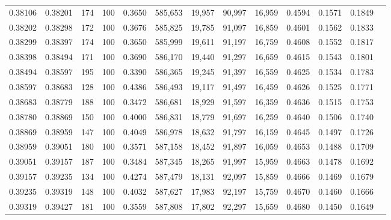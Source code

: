 \begin{tabular}{rrrrrrrrrrrrr}
0.38106 & 0.38201 &   174 & 100 &                                     0.3650 & 585,653 &  19,957 &  90,997 &  16,959 & 0.4594 & 0.1571 & 0.1849 \\
0.38202 & 0.38298 &   172 & 100 &                                     0.3676 & 585,825 &  19,785 &  91,097 &  16,859 & 0.4601 & 0.1562 & 0.1833 \\
0.38299 & 0.38397 &   174 & 100 &                                     0.3650 & 585,999 &  19,611 &  91,197 &  16,759 & 0.4608 & 0.1552 & 0.1817 \\
0.38398 & 0.38494 &   171 & 100 &                                     0.3690 & 586,170 &  19,440 &  91,297 &  16,659 & 0.4615 & 0.1543 & 0.1801 \\
0.38494 & 0.38597 &   195 & 100 &                                     0.3390 & 586,365 &  19,245 &  91,397 &  16,559 & 0.4625 & 0.1534 & 0.1783 \\
0.38597 & 0.38683 &   128 & 100 &                                     0.4386 & 586,493 &  19,117 &  91,497 &  16,459 & 0.4626 & 0.1525 & 0.1771 \\
0.38683 & 0.38779 &   188 & 100 &                                     0.3472 & 586,681 &  18,929 &  91,597 &  16,359 & 0.4636 & 0.1515 & 0.1753 \\
0.38780 & 0.38869 &   150 & 100 &                                     0.4000 & 586,831 &  18,779 &  91,697 &  16,259 & 0.4640 & 0.1506 & 0.1740 \\
0.38869 & 0.38959 &   147 & 100 &                                     0.4049 & 586,978 &  18,632 &  91,797 &  16,159 & 0.4645 & 0.1497 & 0.1726 \\
0.38959 & 0.39051 &   180 & 100 &                                     0.3571 & 587,158 &  18,452 &  91,897 &  16,059 & 0.4653 & 0.1488 & 0.1709 \\
0.39051 & 0.39157 &   187 & 100 &                                     0.3484 & 587,345 &  18,265 &  91,997 &  15,959 & 0.4663 & 0.1478 & 0.1692 \\
0.39157 & 0.39235 &   134 & 100 &                                     0.4274 & 587,479 &  18,131 &  92,097 &  15,859 & 0.4666 & 0.1469 & 0.1679 \\
0.39235 & 0.39319 &   148 & 100 &                                     0.4032 & 587,627 &  17,983 &  92,197 &  15,759 & 0.4670 & 0.1460 & 0.1666 \\
0.39319 & 0.39427 &   181 & 100 &                                     0.3559 & 587,808 &  17,802 &  92,297 &  15,659 & 0.4680 & 0.1450 & 0.1649 \\

\end{tabular}
